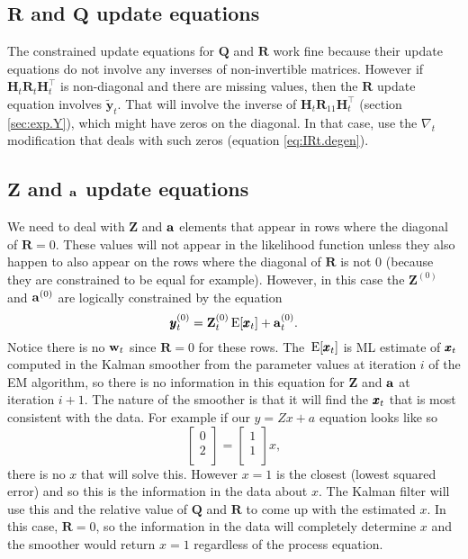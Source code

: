 \documentclass[]{article}
\def\XI{\mbox{\boldmath $\Xi$}}
\def\E{\,\textup{\textrm{E}}}
\def\HH{\mbox{$\mathbf H$}}	\def\hh{\mbox{$\mathbf h$}}
\def\QQ{\mbox{$\mathbf Q$}}	 \def\qq{\mbox{$\mathbf q$}} \def\Qb{\mbox{$\mathbf G$}}  \def\Qm{\mathbb{Q}}
\def\RR{\mbox{$\mathbf R$}}	 \def\rr{\mbox{$\mathbf r$}} \def\Rb{\mbox{$\mathbf H$}}	\def\Rm{\mathbb{R}}
\def\ZZ{\mbox{$\mathbf Z$}}	\def\zz{\mbox{$\mathbf z$}}	\def\Zb{\mbox{$\mathbf M$}} \def\Za{\mbox{$\mathbf N$}} \def\Zm{\XI}
\def\hatyt{\widetilde{\mbox{$\mathbf y$}}_t}
\def\IR{\nabla}
\begin{document}
\subsection{$\RR$ and $\QQ$ update equations}
The constrained update equations for  $\QQ$ and $\RR$ work fine because their update equations do not involve any inverses of non-invertible matrices. However if $\HH_t\RR_t\HH_t^\top$ is non-diagonal and there are missing values, then the $\RR$ update equation  involves $\hatyt$. That will involve the inverse of $\HH_t\RR_{11}\HH_t^\top$  (section \ref{sec:exp.Y}), which might have zeros on the diagonal.  In that case, use the $\IR_t$ modification that deals with such zeros (equation \ref{eq:IRt.degen}).


\subsection{$\ZZ$ and $\aa$ update equations}
We need to deal with $\ZZ$ and $\aa$ elements that appear in rows where the diagonal of $\RR=0$.  These values will not appear in the likelihood function unless they also happen to also appear on the rows where the diagonal of $\RR$ is not 0 (because they are constrained to be equal for example).  However, in this case the $\ZZ^{(0)}$ and $\aa^{(0)}$ are logically constrained by the equation
$$\yy_t^{(0)}=\ZZ_t^{(0)}\E[\xx_t]+\aa_t^{(0)}.$$
Notice there is no $\ww_t$ since $\RR=0$ for these rows.  The $\E[\xx_t]$ is ML estimate of $\xx_t$ computed in the Kalman smoother from the parameter values at iteration $i$ of the EM algorithm, so there is no information in this equation for $\ZZ$ and $\aa$ at iteration $i+1$.  The nature of the smoother is that it will find the $\xx_t$ that is most consistent with the data.  For example if our $y=Zx+a$ equation looks like so
\begin{equation}
\begin{bmatrix}
0\\
2\\
\end{bmatrix}
=
\begin{bmatrix}
1\\
1\\
\end{bmatrix}
x,
\end{equation}
there is no $x$ that will solve this.  However $x=1$ is the closest (lowest squared error) and so this is the information in the data about $x$.  The Kalman filter will use this and the relative value of $\QQ$ and $\RR$ to come up with the estimated $x$.  In this case, $\RR=0$, so the information in the data will completely determine $x$ and the smoother would return $x=1$ regardless of the process equation.
\end{document}
